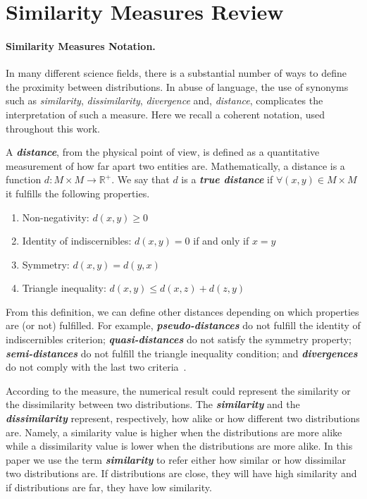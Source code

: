 \section{Similarity Measures Review}\label{sec:measures}

\paragraph{Similarity Measures Notation.}
In many different science fields, there is a substantial number of ways to define the proximity between distributions. In abuse of language, the use of synonyms such as \textit{similarity}, \textit{dissimilarity}, \textit{divergence} and, \textit{distance}, complicates the interpretation of such a measure. Here we recall a coherent notation, used throughout this work.

A \textbf{\textit{distance}}, from the physical point of view, is defined as a quantitative measurement of how far apart two entities are. Mathematically, a distance is a function $d : M \times M \rightarrow \mathbb{R}^+$. We say that $d$ is a \textbf{\textit{true distance}} if $\forall (x, y) \in M \times M$ it fulfills the following properties.

\begin{enumerate}%
 \item Non-negativity: $d(x, y)\geq 0$
 \item Identity of indiscernibles: $d(x, y) = 0$ if and only if $x = y$
 \item Symmetry: $d(x, y) = d(y, x)$
 \item Triangle inequality: $d(x, y) \leq d(x, z) + d(z, y)$
\end{enumerate}

From this definition, we can define other distances depending on which properties are (or not) fulfilled. For example, \textbf{\textit{pseudo-distances}} do not fulfill the identity of indiscernibles criterion; \textbf{\textit{quasi-distances}} do not satisfy the symmetry property; \textbf{\textit{semi-distances}} do not fulfill the triangle inequality condition; and \textbf{\textit{divergences}} do not comply with the last two criteria~\citep{Khamsi:JFPTA:2015}.

According to the measure, the numerical result could represent the similarity or the dissimilarity between two distributions. The \textbf{\textit{similarity}} and the \textbf{\textit{dissimilarity}} represent, respectively, how alike or how different two distributions are. Namely, a similarity value is higher when the distributions are more alike while a dissimilarity value is lower when the distributions are more alike. In this paper we use the term \textbf{\textit{similarity}} to refer either how similar or how dissimilar two distributions are. If distributions are close, they will have high similarity and if distributions are far, they have low similarity. 
 
